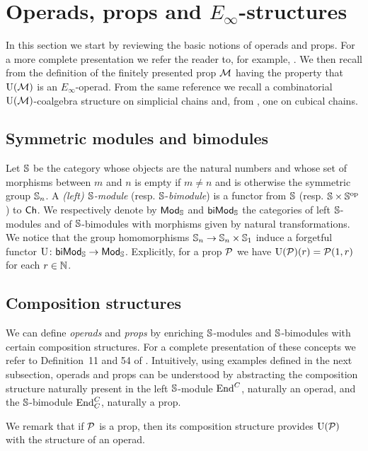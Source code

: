 
\section{Operads, props and \texorpdfstring{$E_\infty$}{E-infty}-structures} \label{s:operads and props}

In this section we start by reviewing the basic notions of operads and props.
For a more complete presentation we refer the reader to, for example, \cite{markl2008props}.
We then recall from \cite{medina2020prop1} the definition of the finitely presented prop $\M$ having the property that $\UM$ is an $E_{\infty}$-operad.
From the same reference we recall a combinatorial $\UM$-coalgebra structure on simplicial chains and, from \cite{medina2021cubical}, one on cubical chains.

\subsection{Symmetric modules and bimodules}

Let $\S$ be the category whose objects are the natural numbers and whose set of morphisms between $m$ and $n$ is empty if $m \neq n$ and is otherwise the symmetric group $\S_n$.
A \textit{(left) $\S$-module} (resp. $\S$-\textit{bimodule}) is a functor from $\S$ (resp. $\S \times \S^\op$) to $\Ch$.
We respectively denote by $\Smod$ and $\Sbimod$ the categories of left $\S$-modules and of $\S$-bimodules with morphisms given by natural transformations.
We notice that the group homomorphisms $\S_n \to \S_n \times \S_1$ induce a forgetful functor $\forget \colon \Sbimod \to \Smod$.
Explicitly, for a prop $\cP$ we have $\forget(\cP)(r) = \cP(1, r)$ for each $r \in \N$.

\subsection{Composition structures}

We can define \textit{operads} and \textit{props} by enriching $\S$-modules and $\S$-bimodules with certain composition structures.
For a complete presentation of these concepts we refer to Definition~11 and 54 of \cite{markl2008props}.
Intuitively, using examples defined in the next subsection, operads and props can be understood by abstracting the composition structure naturally present in the left $\S$-module $\End^C$, naturally an operad, and the $\S$-bimodule $\End^C_C$, naturally a prop.

We remark that if $\cP$ is a prop, then its composition structure provides $\forget(\cP)$ with the structure of an operad.

